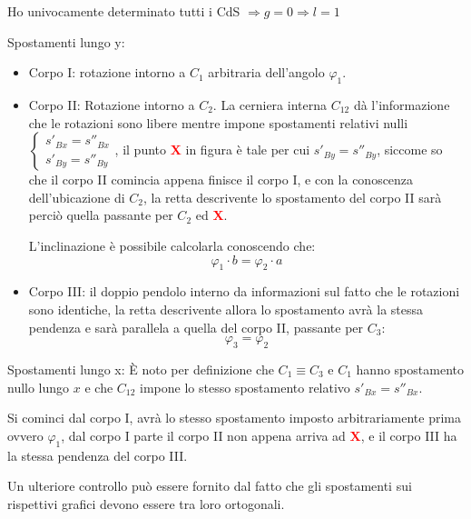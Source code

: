 \documentclass{article}
\begin{document}
\begin{adjustwidth}{2in}{}
Ho univocamente determinato tutti i CdS $\Rightarrow g=0 \Rightarrow l=1$ \newline 

Spostamenti lungo y: 
\begin{itemize}
	\item Corpo I: rotazione intorno a $C_1$ arbitraria dell'angolo $\varphi_1$.
	\item Corpo II: Rotazione intorno a $C_2$. La cerniera interna $C_{12}$ dà l'informazione che le rotazioni sono libere mentre impone spostamenti relativi nulli $\begin{cases}
		s'_{Bx} = s''_{Bx} \\
		s'_{By} = s''_{By} 
	\end{cases}$, il punto \textcolor{red}{$\textbf{X}$} in figura è tale per cui $s'_{By} = s''_{By}$, siccome so che il corpo II comincia appena finisce il corpo I, e con la conoscenza dell'ubicazione di $C_2$, la retta descrivente lo spostamento del corpo II sarà perciò quella passante per $C_2$ ed \textcolor{red}{$\textbf{X}$}.

	 L'inclinazione è possibile calcolarla conoscendo che: 
\[ \varphi_1 \cdot b = \varphi_2 \cdot a \]
	\item Corpo III: il doppio pendolo interno da informazioni sul fatto che le rotazioni sono identiche, la retta descrivente allora lo spostamento avrà la stessa pendenza e sarà parallela a quella del corpo II, passante per $C_3$: 
	\[\varphi_3 = \varphi_2\]
\end{itemize}

Spostamenti lungo x: \newline 
È noto per definizione che $C_1 \equiv C_3$ e $C_1$ hanno spostamento nullo lungo $x$ e che $C_{12}$ impone lo stesso spostamento relativo $s'_{Bx} = s''_{Bx}$. 

Si cominci dal corpo I, avrà lo stesso spostamento imposto arbitrariamente prima ovvero $\varphi_1$, dal corpo I parte il corpo II non appena arriva ad \textcolor{red}{$\textbf{X}$}, e il corpo III ha la stessa pendenza del corpo III. 

Un ulteriore controllo può essere fornito dal fatto che gli spostamenti sui rispettivi grafici devono essere tra loro ortogonali. \newline 


\end{adjustwidth}
\end{document}
